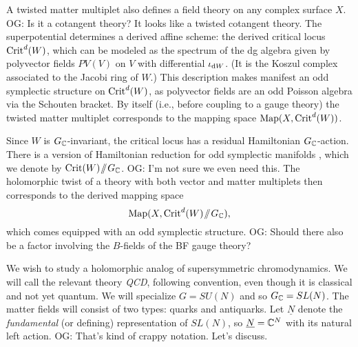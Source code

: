 \documentclass[11pt]{amsart}
\def\owen#1{{\textcolor{violet!65!black}{OG: {#1}}}}
\begin{document}
\def\Sslash{\!\sslash\!}

A twisted matter multiplet also defines a field theory on any complex surface $X$. 
\owen{Is it a cotangent theory? It looks like a twisted cotangent theory.}
The superpotential determines a derived affine scheme: the derived critical locus ${\rm Crit}^d(W)$, which can be modeled as the spectrum of the dg algebra given by polyvector fields $PV(V)$ on $V$ with differential $\iota_{{\rm d} W}$.
(It is the Koszul complex associated to the Jacobi ring of $W$.)
This description makes manifest an odd symplectic structure on ${\rm Crit}^d(W)$,
as polyvector fields are an odd Poisson algebra via the Schouten bracket.
By itself (i.e., before coupling to a gauge theory) the twisted matter multiplet corresponds to the mapping space ${\rm Map}(X, {\rm Crit}^d(W))$. 

Since $W$ is $G_\mathbb C$-invariant, the critical locus has a residual Hamiltonian $G_\mathbb C$-action. 
There is a version of Hamiltonian reduction for odd symplectic manifolds \cite{Pavel, Kevin, who else},
which we denote by ${\rm Crit}(W) \Sslash G_\CC$. 
\owen{I'm not sure we even need this.}
The holomorphic twist of a theory with both vector and matter multiplets then corresponds to the  derived mapping space
\[
{\rm Map}(X , {\rm Crit}^d(W) \Sslash G_\CC), 
\]
which comes equipped with an odd symplectic structure. 
\owen{Should there also be a factor involving the $B$-fields of the BF gauge theory?}

We wish to study a holomorphic analog of supersymmetric chromodynamics.
We will call the relevant theory {\it QCD}, following convention, even though it is classical and not yet quantum.
We will specialize $G = SU(N)$ and so $G_\mathbb C = SL(N)$.
The matter fields will consist of two types: quarks and antiquarks.
Let $\underline{N}$ denote the {\em fundamental} (or defining) representation of $SL(N)$,
so $\underline{N} = \mathbb C^N$ with its natural left action.
\owen{That's kind of crappy notation. Let's discuss.}

\end{document}

